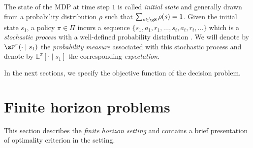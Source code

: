 The state of the MDP at time step $1$ is called \emph{initial state} and generally drawn from a probability distribution $\rho$ such that $\sum_{s\in\gS}\rho(s)=1$.
Given the initial state $s_1$, a policy $\pi\in\Pi$ incurs a sequence $\{s_1,a_1,r_1,\dots,s_t,a_t,r_t,\dots\}$ which is a \emph{stochastic process} with a well-defined probability distribution \cite[Section~2.1.6]{puterman2014markov}.
We will denote by $\sP^\pi(\cdot\mid s_1)$ the \emph{probability measure} associated with this stochastic process and denote by $\mathbb{E}^\pi[\cdot \mid s_1]$ the corresponding \emph{expectation}.


In the next sections, we specify the objective function of the decision problem.


\section{Finite horizon problems}

This section describes the \emph{finite horizon setting} and contains a brief presentation of optimality criterion in the setting.

